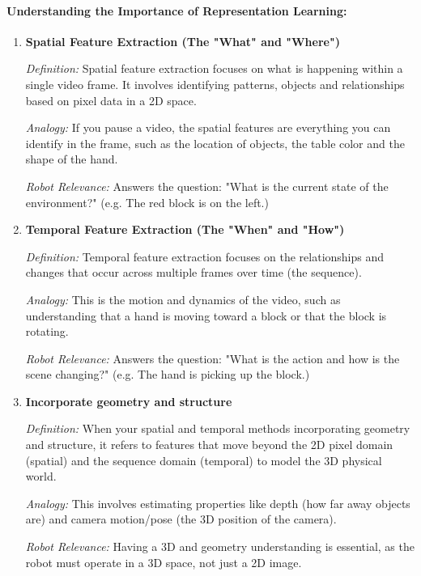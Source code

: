 \paragraph{Understanding the Importance of Representation Learning:}
\begin{enumerate}
    \item \textbf{Spatial Feature Extraction (The "What" and "Where")}
    
    \textit{Definition:} Spatial feature extraction focuses on what is happening within a single video frame. It involves identifying patterns, objects and relationships based on pixel data in a 2D space.

    \textit{Analogy:} 
    If you pause a video, the spatial features are everything you can identify in the frame, such as the location of objects, the table color and the shape of the hand.


    \textit{Robot Relevance:} Answers the question: "What is the current state of the environment?" (e.g. The red block is on the left.)

    \item \textbf{Temporal Feature Extraction (The "When" and "How")}
    
    \textit{Definition:} Temporal feature extraction focuses on the relationships and changes that occur across multiple frames over time (the sequence).
    
    \textit{Analogy:} This is the motion and dynamics of the video, such as understanding that a hand is moving toward a block or that the block is rotating.
    
    \textit{Robot Relevance:} Answers the question: "What is the action and how is the scene changing?" (e.g. The hand is picking up the block.)

    \item \textbf{Incorporate geometry and structure}
    
    \textit{Definition:} When your spatial and temporal methods incorporating geometry and structure, it refers to features that move beyond the 2D pixel domain (spatial) and the sequence domain (temporal) to model the 3D physical world.
    
    \textit{Analogy:} This involves estimating properties like depth (how far away objects are) and camera motion/pose (the 3D position of the camera).

    \textit{Robot Relevance:} Having a 3D and geometry understanding is essential, as the robot must operate in a 3D space, not just a 2D image.

\end{enumerate}







